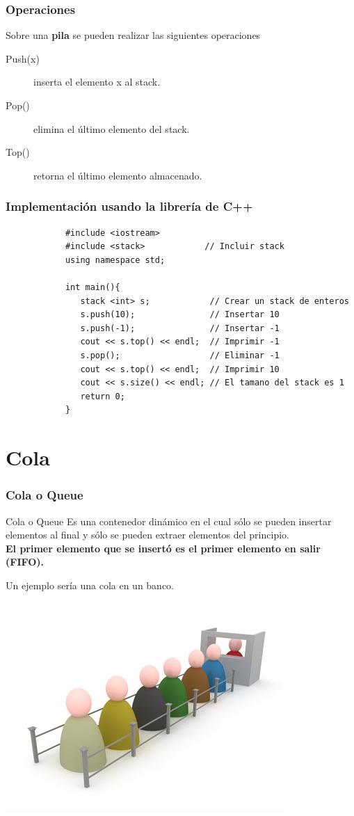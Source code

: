 \documentclass{beamer}
\begin{document}
	\begin{frame}
		\frametitle{Operaciones}
		Sobre una \textbf{pila} se pueden realizar las siguientes operaciones
		\begin{description}
			\item[Push(x)] inserta el elemento x al stack.
			\item[Pop()] elimina el último elemento del stack.
			\item[Top()] retorna el último elemento almacenado.
		\end{description}
	\end{frame}
	
	\begin{frame}[fragile]
		\frametitle{Implementación usando la librería de C++}
		\begin{lstlisting}
			#include <iostream>
			#include <stack>            // Incluir stack
			using namespace std;

			int main(){
			   stack <int> s;            // Crear un stack de enteros
			   s.push(10);               // Insertar 10
			   s.push(-1);               // Insertar -1
			   cout << s.top() << endl;  // Imprimir -1
			   s.pop();                  // Eliminar -1
			   cout << s.top() << endl;  // Imprimir 10
			   cout << s.size() << endl; // El tamano del stack es 1
			   return 0;
			}
		\end{lstlisting}
	\end{frame}
	
\section{Cola}
	\begin{frame}
		\frametitle{Cola o Queue}
		\begin{block}{Cola o Queue}
			Es una contenedor dinámico en el cual sólo se pueden insertar elementos al final y sólo se pueden extraer elementos del principio.\\
			\textbf{El primer elemento que se insertó es el primer elemento en salir (FIFO).}\\
		\end{block}		
		Un ejemplo sería una cola en un banco.\\
		\begin{center}
			\includegraphics[height = 0.4\textheight]{queue_banco.jpg}
		\end{center}
	\end{frame}
	
\end{document}
